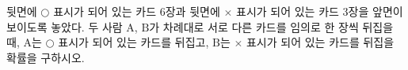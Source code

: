 뒷면에 $\bigcirc$ 표시가 되어 있는 카드 $6$장과 뒷면에 $\times$ 표시가 되어 있는 카드 $3$장을 앞면이 보이도록 놓았다. 두 사람 $\mathrm{A}$, $\mathrm{B}$가 차례대로 서로 다른 카드를 임의로 한 장씩 뒤집을 때, $\mathrm{A}$는 $\bigcirc$ 표시가 되어 있는 카드를 뒤집고, $\mathrm{B}$는 $\times$ 표시가 되어 있는 카드를 뒤집을 확률을 구하시오.
